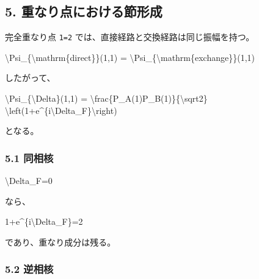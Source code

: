\documentclass[
  a4paper,
]{article}
\newenvironment{Shaded}{}{}
\newcommand{\NormalTok}[1]{#1}
\begin{document}
\subsection{5.
重なり点における節形成}\label{ux91cdux306aux308aux70b9ux306bux304aux3051ux308bux7bc0ux5f62ux6210}

完全重なり点 \texttt{1=2} では、直接経路と交換経路は同じ振幅を持つ。

\begin{Shaded}
\begin{Highlighting}[]
\NormalTok{\textbackslash{}Psi\_\{\textbackslash{}mathrm\{direct\}\}(1,1)}
\NormalTok{=}
\NormalTok{\textbackslash{}Psi\_\{\textbackslash{}mathrm\{exchange\}\}(1,1)}
\end{Highlighting}
\end{Shaded}

したがって、

\begin{Shaded}
\begin{Highlighting}[]
\NormalTok{\textbackslash{}Psi\_\{\textbackslash{}Delta\}(1,1)}
\NormalTok{=}
\NormalTok{\textbackslash{}frac\{P\_A(1)P\_B(1)\}\{\textbackslash{}sqrt2\}}
\NormalTok{\textbackslash{}left(1+e\^{}\{i\textbackslash{}Delta\_F\}\textbackslash{}right)}
\end{Highlighting}
\end{Shaded}

となる。

\subsubsection{5.1 同相核}\label{ux540cux76f8ux6838}

\begin{Shaded}
\begin{Highlighting}[]
\NormalTok{\textbackslash{}Delta\_F=0}
\end{Highlighting}
\end{Shaded}

なら、

\begin{Shaded}
\begin{Highlighting}[]
\NormalTok{1+e\^{}\{i\textbackslash{}Delta\_F\}=2}
\end{Highlighting}
\end{Shaded}

であり、重なり成分は残る。

\subsubsection{5.2 逆相核}\label{ux9006ux76f8ux6838}
\end{document}
